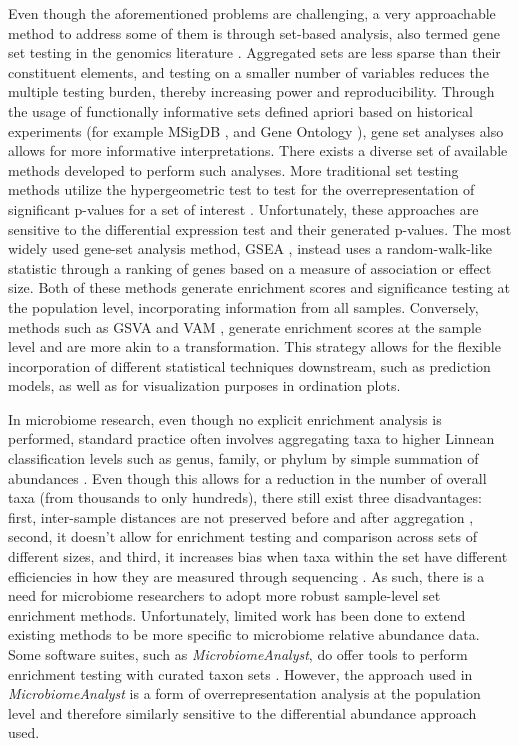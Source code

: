 \documentclass[10pt,letterpaper]{article}
\begin{document}
Even though the aforementioned problems are challenging, a very approachable method to address some of them is through set-based analysis, also termed gene set testing in the genomics literature \cite{khatri2012, goeman2007}. Aggregated sets are less sparse than their constituent elements, and testing on a smaller number of variables reduces the multiple testing burden, thereby increasing power and reproducibility. Through the usage of functionally informative sets defined apriori based on historical experiments (for example MSigDB \cite{subramanian2005}, and Gene Ontology \cite{ashburner2000}), gene set analyses also allows for more informative interpretations. There exists a diverse set of available methods developed to perform such analyses. More traditional set testing methods utilize the hypergeometric test to test for the overrepresentation of significant p-values for a set of interest \cite{goeman2007}. Unfortunately, these approaches are sensitive to the differential expression test and their generated p-values. The most widely used gene-set analysis method, GSEA \cite{subramanian2005}, instead uses a random-walk-like statistic through a ranking of genes based on a measure of association or effect size. Both of these methods generate enrichment scores and significance testing at the population level, incorporating information from all samples. Conversely, methods such as GSVA \cite{hanzelmann2013} and VAM \cite{frost2020a}, generate enrichment scores at the sample level and are more akin to a transformation. This strategy allows for the flexible incorporation of different statistical techniques downstream, such as prediction models, as well as for visualization purposes in ordination plots.  

In microbiome research, even though no explicit enrichment analysis is performed, standard practice often involves aggregating taxa to higher Linnean classification levels such as genus, family, or phylum by simple summation of abundances \cite{mclaren2019}. Even though this allows for a reduction in the number of overall taxa (from thousands to only hundreds), there still exist three disadvantages: first, inter-sample distances are not preserved before and after aggregation \cite{egozcue2005}, second, it doesn't allow for enrichment testing and comparison across sets of different sizes, and third, it increases bias when taxa within the set have different efficiencies in how they are measured through sequencing \cite{mclaren2019}. As such, there is a need for microbiome researchers to adopt more robust sample-level set enrichment methods. Unfortunately, limited work has been done to extend existing methods to be more specific to microbiome relative abundance data. Some software suites, such as \emph{MicrobiomeAnalyst}, do offer tools to perform enrichment testing with curated taxon sets \cite{chong2020}. However, the approach used in \emph{MicrobiomeAnalyst} is a form of overrepresentation analysis at the population level and therefore similarly sensitive to the differential abundance approach used. 
\end{document}
